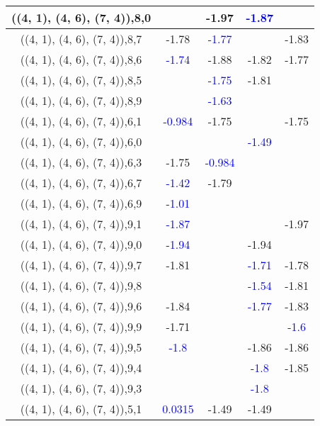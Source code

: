 \documentclass{article}
\begin{document}
\begin{center}
\begin{longtable}{|c|c|c|c|c|}
        	\hline
        	((4, 1), (4, 6), (7, 4)),8,0&&-1.97& \textcolor{blue}{-1.87}&\\
        	\hline
        	((4, 1), (4, 6), (7, 4)),8,7&-1.78& \textcolor{blue}{-1.77}&&-1.83\\
        	\hline
        	((4, 1), (4, 6), (7, 4)),8,6& \textcolor{blue}{-1.74}&-1.88&-1.82&-1.77\\
        	\hline
        	((4, 1), (4, 6), (7, 4)),8,5&& \textcolor{blue}{-1.75}&-1.81&\\
        	\hline
        	((4, 1), (4, 6), (7, 4)),8,9&& \textcolor{blue}{-1.63}&&\\
        	\hline
        	((4, 1), (4, 6), (7, 4)),6,1& \textcolor{blue}{-0.984}&-1.75&&-1.75\\
        	\hline
        	((4, 1), (4, 6), (7, 4)),6,0&&& \textcolor{blue}{-1.49}&\\
        	\hline
        	((4, 1), (4, 6), (7, 4)),6,3&-1.75& \textcolor{blue}{-0.984}&&\\
        	\hline
        	((4, 1), (4, 6), (7, 4)),6,7& \textcolor{blue}{-1.42}&-1.79&&\\
        	\hline
        	((4, 1), (4, 6), (7, 4)),6,9& \textcolor{blue}{-1.01}&&&\\
        	\hline
        	((4, 1), (4, 6), (7, 4)),9,1& \textcolor{blue}{-1.87}&&&-1.97\\
        	\hline
        	((4, 1), (4, 6), (7, 4)),9,0& \textcolor{blue}{-1.94}&&-1.94&\\
        	\hline
        	((4, 1), (4, 6), (7, 4)),9,7&-1.81&& \textcolor{blue}{-1.71}&-1.78\\
        	\hline
        	((4, 1), (4, 6), (7, 4)),9,8&&& \textcolor{blue}{-1.54}&-1.81\\
        	\hline
        	((4, 1), (4, 6), (7, 4)),9,6&-1.84&& \textcolor{blue}{-1.77}&-1.83\\
        	\hline
        	((4, 1), (4, 6), (7, 4)),9,9&-1.71&&& \textcolor{blue}{-1.6}\\
        	\hline
        	((4, 1), (4, 6), (7, 4)),9,5& \textcolor{blue}{-1.8}&&-1.86&-1.86\\
        	\hline
        	((4, 1), (4, 6), (7, 4)),9,4&&& \textcolor{blue}{-1.8}&-1.85\\
        	\hline
        	((4, 1), (4, 6), (7, 4)),9,3&&& \textcolor{blue}{-1.8}&\\
        	\hline
        	((4, 1), (4, 6), (7, 4)),5,1& \textcolor{blue}{0.0315}&-1.49&-1.49&\\
        	\hline

\end{longtable}
\end{center}
\end{document}
